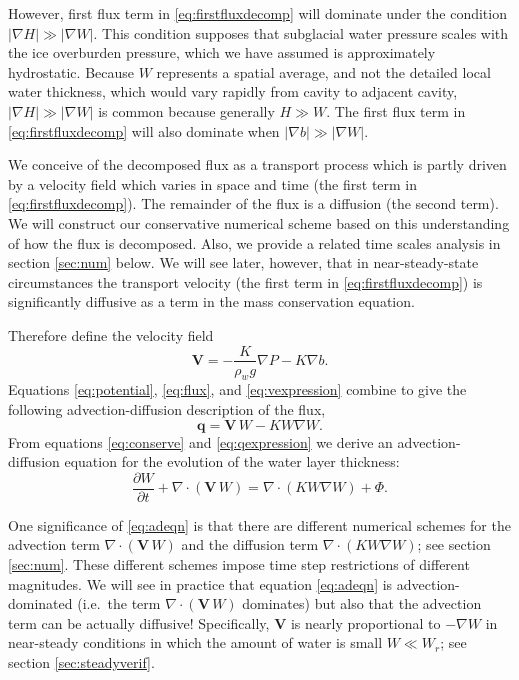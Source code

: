 \documentclass[11pt,final]{amsart}%
\newcommand\bV{\mathbf{V}}
\newcommand\bq{\mathbf{q}}
\newcommand{\Div}{\nabla\cdot}
\newcommand{\grad}{\nabla}
\begin{document}
However, first flux term in \eqref{eq:firstfluxdecomp} will dominate under the condition $|\grad H| \gg |\grad W|$.  This condition supposes that subglacial water pressure scales with the ice overburden pressure, which we have assumed is approximately hydrostatic.  Because $W$ represents a spatial average, and not the detailed local water thickness, which would vary rapidly from cavity to adjacent cavity, $|\grad H| \gg |\grad W|$ is common because generally $H\gg W$.  The first flux term in \eqref{eq:firstfluxdecomp} will also dominate when $|\grad b| \gg |\grad W|$. 

We conceive of the decomposed flux as a transport process which is partly driven by a velocity field which varies in space and time (the first term in \eqref{eq:firstfluxdecomp}).  The remainder of the flux is a diffusion (the second term).  We will construct our conservative numerical scheme based on this understanding of how the flux is decomposed.  Also, we provide a related time scales analysis in section \ref{sec:num} below.  We will see later, however, that in near-steady-state circumstances the transport velocity (the first term in \eqref{eq:firstfluxdecomp}) is significantly diffusive as a term in the mass conservation equation.

Therefore define the velocity field
\begin{equation} \label{eq:vexpression}
  \bV = - \frac{K}{\rho_w g} \grad P - K \grad b.
\end{equation}
Equations \eqref{eq:potential}, \eqref{eq:flux}, and \eqref{eq:vexpression} combine to give the following advection-diffusion description of the flux,
\begin{equation} \label{eq:qexpression}
  \bq = \bV\, W - K W \grad W.
\end{equation}
From equations \eqref{eq:conserve} and \eqref{eq:qexpression} we derive an advection-diffusion equation \citep{HundsdorferVerwer2010} for the evolution of the water layer thickness:
\begin{equation} \label{eq:adeqn}
  \frac{\partial W}{\partial t} + \Div\left(\bV\, W\right) = \Div \left(K W \grad W\right) + \Phi.
\end{equation}

One significance of \eqref{eq:adeqn} is that there are different numerical schemes for the advection term $\Div\left(\bV\, W\right)$ and the diffusion term $\Div \left(K W \grad W\right)$; see section \ref{sec:num}.  These different schemes impose time step restrictions of different magnitudes.  We will see in practice that equation \eqref{eq:adeqn} is advection-dominated (i.e.~the term $\Div\left(\bV\, W\right)$ dominates) but also that the advection term can be actually diffusive!  Specifically, $\bV$ is nearly proportional to $-\grad W$ in near-steady conditions in which the amount of water is small $W\ll W_r$; see section \ref{sec:steadyverif}.
\end{document}
